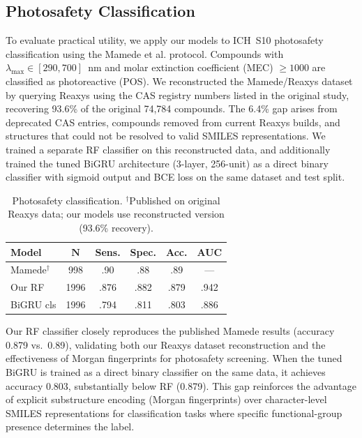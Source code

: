 \subsection{Photosafety Classification}
\label{sec:classification}

To evaluate practical utility, we apply our models to ICH~S10\cite{ICH2013S10} photosafety classification using the Mamede et al.\cite{mamede2021machine} protocol.
Compounds with $\lambda_{\max} \in [290, 700]$~nm and molar extinction coefficient (MEC) $\geq 1000$ are classified as photoreactive (POS).
We reconstructed the Mamede/Reaxys dataset by querying Reaxys using the CAS registry numbers listed in the original study, recovering 93.6\% of the original 74,784 compounds.
The 6.4\% gap arises from deprecated CAS entries, compounds removed from current Reaxys builds, and structures that could not be resolved to valid SMILES representations.
We trained a separate RF classifier on this reconstructed data, and additionally trained the tuned BiGRU architecture (3-layer, 256-unit) as a direct binary classifier with sigmoid output and BCE loss on the same dataset and test split.

\begin{table}[htbp]
\centering
\caption{Photosafety classification. $^\dagger$Published on original Reaxys data; our models use reconstructed version (93.6\% recovery).}
\label{tab:classification}
\footnotesize
\setlength{\tabcolsep}{3pt}
\begin{tabular}{@{}lccccc@{}}
\toprule
\textbf{Model} & $\boldsymbol{N}$ & \textbf{Sens.} & \textbf{Spec.} & \textbf{Acc.} & \textbf{AUC} \\
\midrule
Mamede$^\dagger$ & 998   & .90  & .88  & .89  & --- \\
Our RF           & 1996  & .876 & .882 & .879 & .942 \\
BiGRU cls        & 1996  & .794 & .811 & .803 & .886 \\
\bottomrule
\end{tabular}
\end{table}

Our RF classifier closely reproduces the published Mamede results (accuracy 0.879 vs.\ 0.89), validating both our Reaxys dataset reconstruction and the effectiveness of Morgan fingerprints for photosafety screening.
When the tuned BiGRU is trained as a direct binary classifier on the same data, it achieves accuracy 0.803, substantially below RF (0.879).
This gap reinforces the advantage of explicit substructure encoding (Morgan fingerprints) over character-level SMILES representations for classification tasks where specific functional-group presence determines the label.


